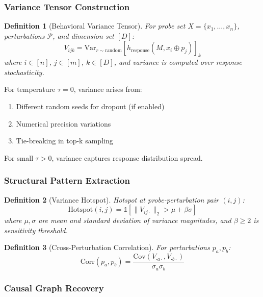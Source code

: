 \documentclass[11pt,a4paper]{article}
\newtheorem{definition}{Definition}
\newcommand{\Var}{\mathrm{Var}}
\newcommand{\Cov}{\mathrm{Cov}}
\begin{document}
\subsubsection{Variance Tensor Construction}

\begin{definition}[Behavioral Variance Tensor]
For probe set $X = \{x_1, \ldots, x_n\}$, perturbations $\mathcal{P}$, and dimension set $[D]$:
\begin{equation}
V_{ijk} = \Var_{r \sim \text{random}}[h_{\text{response}}(M, x_i \oplus p_j)]_k
\end{equation}
where $i \in [n]$, $j \in [m]$, $k \in [D]$, and variance is computed over response stochasticity.
\end{definition}

For temperature $\tau = 0$, variance arises from:
\begin{enumerate}
\item Different random seeds for dropout (if enabled)
\item Numerical precision variations
\item Tie-breaking in top-k sampling
\end{enumerate}

For small $\tau > 0$, variance captures response distribution spread.

\subsubsection{Structural Pattern Extraction}

\begin{definition}[Variance Hotspot]
Hotspot at probe-perturbation pair $(i,j)$:
\begin{equation}
\text{Hotspot}(i,j) = \mathbb{1}\left[\|V_{ij\cdot}\|_2 > \mu + \beta \sigma\right]
\end{equation}
where $\mu, \sigma$ are mean and standard deviation of variance magnitudes, and $\beta \geq 2$ is sensitivity threshold.
\end{definition}

\begin{definition}[Cross-Perturbation Correlation]
For perturbations $p_a, p_b$:
\begin{equation}
\text{Corr}(p_a, p_b) = \frac{\Cov(V_{\cdot a \cdot}, V_{\cdot b \cdot})}{\sigma_a \sigma_b}
\end{equation}
\end{definition}

\subsubsection{Causal Graph Recovery}
\end{document}
